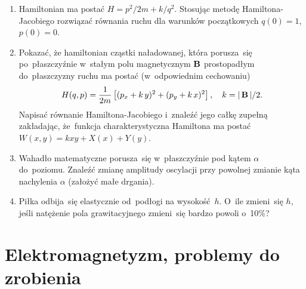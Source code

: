 \documentclass[a4paper,11pt]{article}
\begin{document}
\begin{enumerate}
\item Hamiltonian ma postać $H = p^{ 2 } / 2m + k / q^{ 2 }$. Stosując
  metodę Hamiltona-Jacobiego rozwiązać równania ruchu dla warunków
  początkowych $q( 0 ) = 1$, $p( 0 ) = 0$.



\item Pokazać, że hamiltonian cząstki naładowanej, która porusza~się
  po~płaszczyźnie w~stałym polu magnetycznym $\mathbf{B}$ prostopadłym
  do~płaszczyzny ruchu ma postać (w~odpowiednim cechowaniu)
  \begin{equation*}
    H( q, p ) =
    \frac{ 1 }{ 2m } \left[ ( p_{ x } + k \, y )^{ 2 }
      + ( p_{ y } + k \, x )^{ 2 } \right], \quad
    k = |\, {  \mathbf{B}  } \,| / 2.
  \end{equation*}
  Napisać równanie Hamiltona-Jacobiego i~znaleźć jego całkę zupełną
  zakładając, że~funkcja charakterystyczna Hamiltona ma postać
  $W( x, y ) = k x y + X( x ) + Y( y )$.



\item Wahadło matematyczne porusza~się w~płaszczyźnie pod kątem $\alpha$
  do~poziomu. Znaleźć zmianę amplitudy oscylacji przy powolnej zmianie
  kąta nachylenia $\alpha$ (założyć małe drgania).



\item Piłka odbija~się elastycznie od~podłogi na wysokość~$h$.
  O~ile zmieni~się $h$, jeśli natężenie pola grawitacyjnego zmieni~się
  bardzo powoli o~10\%?



\end{enumerate}










\section{Elektromagnetyzm, problemy do zrobienia}


\end{document}
